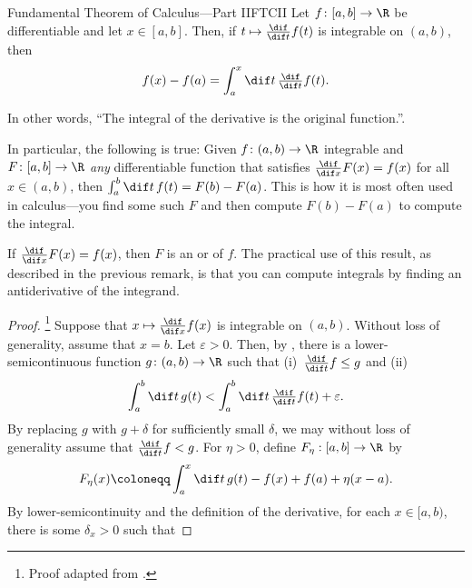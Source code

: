 \begin{thm}{Fundamental Theorem of Calculus---Part II}{FTCII}
Let $f\colon [a,b]\rightarrow \R$ be differentiable and let $x\in [a,b]$.  Then, if $t\mapsto \frac{\dif}{\dif t}f(t)$ is integrable on $(a,b)$, then
\begin{equation}
f(x)-f(a)=\int _a^x\dif t\, \tfrac{\dif}{\dif t}f(t).
\end{equation}
\begin{rmk}
In other words, ``The integral of the derivative is the original function.''.
\end{rmk}
\begin{rmk}
In particular, the following is true:  Given $f\colon (a,b)\rightarrow \R$ integrable and $F\colon [a,b]\rightarrow \R$ \emph{any} differentiable function that satisfies $\frac{\dif}{\dif x}F(x)=f(x)$ for all $x\in (a,b)$, then $\int _a^b\dif t\, f(t)=F(b)-F(a)$.  This is how it is most often used in calculus---you find some such $F$ and then compute $F(b)-F(a)$ to compute the integral.
\end{rmk}
\begin{rmk}
If $\frac{\dif}{\dif x}F(x)=f(x)$, then $F$ is an  or  of $f$.  The practical use of this result, as described in the previous remark, is that you can compute integrals by finding an antiderivative of the integrand.
\end{rmk}
\begin{proof}\footnote{Proof adapted from \cite[pg.~149]{BigRudin}.}
Suppose that $x\mapsto \frac{\dif}{\dif x}f(x)$ is integrable on $(a,b)$.  Without loss of generality, assume that $x=b$.  Let $\varepsilon >0$.  Then, by , there is a lower-semicontinuous function $g\colon (a,b)\rightarrow \R$ such that (i)~$\frac{\dif}{\dif t}f\leq g$ and (ii)
\begin{equation}
\int _a^b\dif t\, g(t)<\int _a^b\dif t\, \tfrac{\dif}{\dif t}f(t)+\varepsilon .
\end{equation}
By replacing $g$ with $g+\delta$ for sufficiently small $\delta$, we may without loss of generality assume that $\frac{\dif}{\dif t}f<g$.  For $\eta >0$, define $F_\eta :[a,b]\rightarrow \R$ by
\begin{equation}\label{Rudin3}
F_\eta (x)\coloneqq \int _a^x\dif t\, g(t)-f(x)+f(a)+\eta (x-a).
\end{equation}
By lower-semicontinuity and the definition of the derivative, for each $x\in [a,b)$, there is some $\delta _x>0$ such that

\end{proof}
\end{thm}
